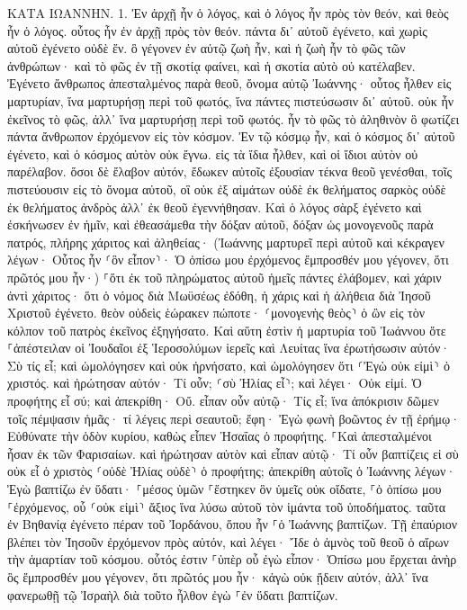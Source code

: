 \documentclass[twoside, 9pt]{extreport}
\begin{document}
ΚΑΤΑ ΙΩΑΝΝΗΝ.
1.
Ἐν ἀρχῇ ἦν ὁ λόγος, καὶ ὁ λόγος ἦν πρὸς τὸν θεόν, καὶ θεὸς ἦν ὁ λόγος. 
οὗτος ἦν ἐν ἀρχῇ πρὸς τὸν θεόν. 
πάντα δι᾽ αὐτοῦ ἐγένετο, καὶ χωρὶς αὐτοῦ ἐγένετο οὐδὲ ἕν. ὃ γέγονεν 
ἐν αὐτῷ ζωὴ ἦν, καὶ ἡ ζωὴ ἦν τὸ φῶς τῶν ἀνθρώπων· 
καὶ τὸ φῶς ἐν τῇ σκοτίᾳ φαίνει, καὶ ἡ σκοτία αὐτὸ οὐ κατέλαβεν. 
Ἐγένετο ἄνθρωπος ἀπεσταλμένος παρὰ θεοῦ, ὄνομα αὐτῷ Ἰωάννης· 
οὗτος ἦλθεν εἰς μαρτυρίαν, ἵνα μαρτυρήσῃ περὶ τοῦ φωτός, ἵνα πάντες πιστεύσωσιν δι᾽ αὐτοῦ. 
οὐκ ἦν ἐκεῖνος τὸ φῶς, ἀλλ᾽ ἵνα μαρτυρήσῃ περὶ τοῦ φωτός. 
ἦν τὸ φῶς τὸ ἀληθινὸν ὃ φωτίζει πάντα ἄνθρωπον ἐρχόμενον εἰς τὸν κόσμον. 
Ἐν τῷ κόσμῳ ἦν, καὶ ὁ κόσμος δι᾽ αὐτοῦ ἐγένετο, καὶ ὁ κόσμος αὐτὸν οὐκ ἔγνω. 
εἰς τὰ ἴδια ἦλθεν, καὶ οἱ ἴδιοι αὐτὸν οὐ παρέλαβον. 
ὅσοι δὲ ἔλαβον αὐτόν, ἔδωκεν αὐτοῖς ἐξουσίαν τέκνα θεοῦ γενέσθαι, τοῖς πιστεύουσιν εἰς τὸ ὄνομα αὐτοῦ, 
οἳ οὐκ ἐξ αἱμάτων οὐδὲ ἐκ θελήματος σαρκὸς οὐδὲ ἐκ θελήματος ἀνδρὸς ἀλλ᾽ ἐκ θεοῦ ἐγεννήθησαν. 
Καὶ ὁ λόγος σὰρξ ἐγένετο καὶ ἐσκήνωσεν ἐν ἡμῖν, καὶ ἐθεασάμεθα τὴν δόξαν αὐτοῦ, δόξαν ὡς μονογενοῦς παρὰ πατρός, πλήρης χάριτος καὶ ἀληθείας· 
(Ἰωάννης μαρτυρεῖ περὶ αὐτοῦ καὶ κέκραγεν λέγων· Οὗτος ἦν ⸂ὃν εἶπον⸃· Ὁ ὀπίσω μου ἐρχόμενος ἔμπροσθέν μου γέγονεν, ὅτι πρῶτός μου ἦν·) 
⸀ὅτι ἐκ τοῦ πληρώματος αὐτοῦ ἡμεῖς πάντες ἐλάβομεν, καὶ χάριν ἀντὶ χάριτος· 
ὅτι ὁ νόμος διὰ Μωϋσέως ἐδόθη, ἡ χάρις καὶ ἡ ἀλήθεια διὰ Ἰησοῦ Χριστοῦ ἐγένετο. 
θεὸν οὐδεὶς ἑώρακεν πώποτε· ⸂μονογενὴς θεὸς⸃ ὁ ὢν εἰς τὸν κόλπον τοῦ πατρὸς ἐκεῖνος ἐξηγήσατο. 
Καὶ αὕτη ἐστὶν ἡ μαρτυρία τοῦ Ἰωάννου ὅτε ⸀ἀπέστειλαν οἱ Ἰουδαῖοι ἐξ Ἱεροσολύμων ἱερεῖς καὶ Λευίτας ἵνα ἐρωτήσωσιν αὐτόν· Σὺ τίς εἶ; 
καὶ ὡμολόγησεν καὶ οὐκ ἠρνήσατο, καὶ ὡμολόγησεν ὅτι ⸂Ἐγὼ οὐκ εἰμὶ⸃ ὁ χριστός. 
καὶ ἠρώτησαν αὐτόν· Τί οὖν; ⸂σὺ Ἠλίας εἶ⸃; καὶ λέγει· Οὐκ εἰμί. Ὁ προφήτης εἶ σύ; καὶ ἀπεκρίθη· Οὔ. 
εἶπαν οὖν αὐτῷ· Τίς εἶ; ἵνα ἀπόκρισιν δῶμεν τοῖς πέμψασιν ἡμᾶς· τί λέγεις περὶ σεαυτοῦ; 
ἔφη· Ἐγὼ φωνὴ βοῶντος ἐν τῇ ἐρήμῳ· Εὐθύνατε τὴν ὁδὸν κυρίου, καθὼς εἶπεν Ἠσαΐας ὁ προφήτης. 
⸀Καὶ ἀπεσταλμένοι ἦσαν ἐκ τῶν Φαρισαίων. 
καὶ ἠρώτησαν αὐτὸν καὶ εἶπαν αὐτῷ· Τί οὖν βαπτίζεις εἰ σὺ οὐκ εἶ ὁ χριστὸς ⸂οὐδὲ Ἠλίας οὐδὲ⸃ ὁ προφήτης; 
ἀπεκρίθη αὐτοῖς ὁ Ἰωάννης λέγων· Ἐγὼ βαπτίζω ἐν ὕδατι· ⸀μέσος ὑμῶν ⸀ἕστηκεν ὃν ὑμεῖς οὐκ οἴδατε, 
⸀ὁ ὀπίσω μου ⸀ἐρχόμενος, οὗ ⸂οὐκ εἰμὶ⸃ ἄξιος ἵνα λύσω αὐτοῦ τὸν ἱμάντα τοῦ ὑποδήματος. 
ταῦτα ἐν Βηθανίᾳ ἐγένετο πέραν τοῦ Ἰορδάνου, ὅπου ἦν ⸀ὁ Ἰωάννης βαπτίζων. 
Τῇ ἐπαύριον βλέπει τὸν Ἰησοῦν ἐρχόμενον πρὸς αὐτόν, καὶ λέγει· Ἴδε ὁ ἀμνὸς τοῦ θεοῦ ὁ αἴρων τὴν ἁμαρτίαν τοῦ κόσμου. 
οὗτός ἐστιν ⸀ὑπὲρ οὗ ἐγὼ εἶπον· Ὀπίσω μου ἔρχεται ἀνὴρ ὃς ἔμπροσθέν μου γέγονεν, ὅτι πρῶτός μου ἦν· 
κἀγὼ οὐκ ᾔδειν αὐτόν, ἀλλ᾽ ἵνα φανερωθῇ τῷ Ἰσραὴλ διὰ τοῦτο ἦλθον ἐγὼ ⸀ἐν ὕδατι βαπτίζων. 
\end{document}
